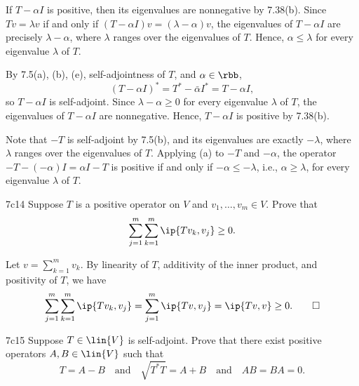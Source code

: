 \begin{solenum}
    \item \rightimp If $T - \alpha I$ is positive, then its eigenvalues are nonnegative by 7.38(b).
    Since $Tv = \lambda v$ if and only if $(T - \alpha I)v = (\lambda - \alpha)v$, the eigenvalues of $T - \alpha I$ are precisely $\lambda - \alpha$, where $\lambda$ ranges over the eigenvalues of $T$.
    Hence, $\alpha \leq \lambda$ for every eigenvalue $\lambda$ of $T$.

    \leftimp By 7.5(a), (b), (e), self-adjointness of $T$, and $\alpha \in \rbb$,
    \[
        (T - \alpha I)^\ast = T^\ast - \bar\alpha I^\ast = T - \alpha I,
    \]
    so $T - \alpha I$ is self-adjoint.
    Since $\lambda - \alpha \geq 0$ for every eigenvalue $\lambda$ of $T$, the eigenvalues of $T - \alpha I$ are nonnegative.
    Hence, $T - \alpha I$ is positive by 7.38(b).
    \item Note that $-T$ is self-adjoint by 7.5(b), and its eigenvalues are exactly $-\lambda$, where $\lambda$ ranges over the eigenvalues of $T$.
    Applying (a) to $-T$ and $-\alpha$, the operator $-T - (-\alpha)I = \alpha I - T$ is positive if and only if $-\alpha \leq -\lambda$, i.e., $\alpha \geq \lambda$, for every eigenvalue $\lambda$ of $T$.
\end{solenum}

\begin{exercise}{7c14}
    Suppose $T$ is a positive operator on $V$ and $v_1, \ldots, v_m \in V$.
    Prove that
    \[
        \sum_{j=1}^{m} \sum_{k=1}^{m} \ip{Tv_k, v_j} \geq 0.
    \]
\end{exercise}

\begin{sol}
    Let $v = \sum_{k=1}^{m} v_k$.
    By linearity of $T$, additivity of the inner product, and positivity of $T$, we have
    \[
        \sum_{j=1}^{m} \sum_{k=1}^{m} \ip{Tv_k, v_j} = \sum_{j=1}^{m} \ip{T v, v_j} = \ip{Tv, v} \geq 0. \qedhere
    \]
\end{sol}

\begin{exercise}{7c15}
    Suppose $T \in \lin{V}$ is self-adjoint.
    Prove that there exist positive operators $A, B \in \lin{V}$ such that
    \[
        T = A - B \quad \text{and} \quad \sqrt{T^\ast T} = A + B \quad \text{and} \quad AB = BA = 0.
    \]
\end{exercise}

